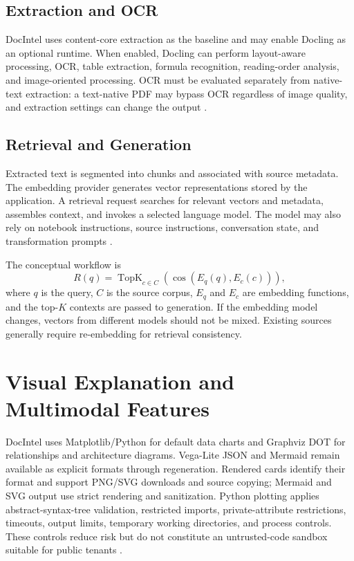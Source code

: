 \documentclass[conference]{IEEEtran}
\begin{document}
\subsection{Extraction and OCR}
DocIntel uses content-core extraction as the baseline and may enable Docling as an optional runtime. When enabled, Docling can perform layout-aware processing, OCR, table extraction, formula recognition, reading-order analysis, and image-oriented processing. OCR must be evaluated separately from native-text extraction: a text-native PDF may bypass OCR regardless of image quality, and extraction settings can change the output \cite{docling2024,doclingDocs2026}.

\subsection{Retrieval and Generation}
Extracted text is segmented into chunks and associated with source metadata. The embedding provider generates vector representations stored by the application. A retrieval request searches for relevant vectors and metadata, assembles context, and invokes a selected language model. The model may also rely on notebook instructions, source instructions, conversation state, and transformation prompts \cite{docintel}.

The conceptual workflow is
\begin{equation}
 R(q)=\operatorname{TopK}_{c \in C}\left(\cos(E_q(q),E_c(c))\right),
\end{equation}
where $q$ is the query, $C$ is the source corpus, $E_q$ and $E_c$ are embedding functions, and the top-$K$ contexts are passed to generation. If the embedding model changes, vectors from different models should not be mixed. Existing sources generally require re-embedding for retrieval consistency.

\section{Visual Explanation and Multimodal Features}
DocIntel uses Matplotlib/Python for default data charts and Graphviz DOT for relationships and architecture diagrams. Vega-Lite JSON and Mermaid remain available as explicit formats through regeneration. Rendered cards identify their format and support PNG/SVG downloads and source copying; Mermaid and SVG output use strict rendering and sanitization. Python plotting applies abstract-syntax-tree validation, restricted imports, private-attribute restrictions, timeouts, output limits, temporary working directories, and process controls. These controls reduce risk but do not constitute an untrusted-code sandbox suitable for public tenants \cite{docintel}.
\end{document}
